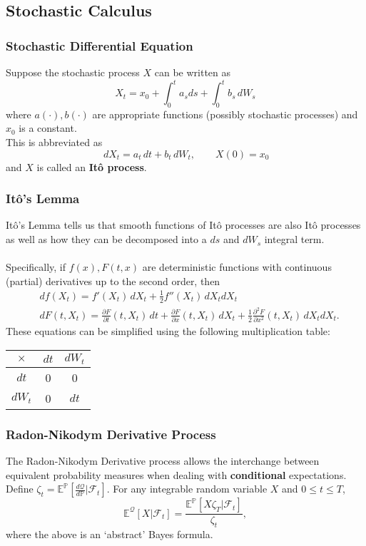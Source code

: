 \documentclass[11pt]{article}
\newcommand{\E}{\mathbb{E}}
\newcommand{\F}{\mathcal{F}}
\renewcommand{\Pr}{\mathbb{P}}
\newcommand{\Q}{\mathcal{Q}}
\begin{document}
	\subsection{Stochastic Calculus} 
	\subsubsection{Stochastic Differential Equation}
	Suppose the stochastic process \( X \) can be written as
	\[	X_t = x_0 + \int_{0}^{t} a_s ds + \int_{0}^{t} b_s \, dW_s\]
	where \( a(\cdot), b(\cdot) \) are appropriate functions (possibly stochastic processes) and \( x_0 \) is a constant.\\
	This is abbreviated as
	\[	\, dX_t = a_t \, dt + b_t \, dW_t, \qquad X(0) = x_0\]
	and \( X \) is called an \textbf{It\^{o} process}.
	\subsubsection{It\^{o}'s Lemma}
	It\^{o}'s Lemma tells us that smooth functions of It\^{o} processes are also It\^{o} processes as well as how they can be decomposed into a \( ds \) and \( dW_s \) integral term. \\\\
	\noindent Specifically, if \( f(x), F(t, x) \) are deterministic functions with continuous (partial) derivatives up to the second order, then
	\begin{align*}
		& df(X_t) = f'(X_t) \, dX_t + \frac{1}{2}f''(X_t) \, dX_t dX_t \\
		& dF(t, X_t) = \frac{\partial F}{\partial t}(t, X_t)\, dt + \frac{\partial F}{\partial x}(t, X_t) \, dX_t + \frac{1}{2}\frac{\partial^2 F}{\partial x^2}(t, X_t) \, dX_t dX_t.
	\end{align*}
	These equations can be simplified using the following multiplication table:
	\begin{center}
		\begin{tabular}{ccc}
			\( \times \) & \( dt \) & \( dW_t \)\\
			\hline
			\hline
			\( dt \) & 0 & 0 \\
			\hline
			\( dW_t \) & 0 & $dt$ \\
			\hline
			\end{tabular}
		\end{center}
	\subsubsection{Radon-Nikodym Derivative Process}
	The Radon-Nikodym Derivative process allows the interchange between equivalent probability measures when dealing with \textbf{conditional} expectations. Define \( \zeta_t = \E^{\Pr}[\frac{d\Q}{d\Pr}|\mathcal{F}_t]\). For any integrable random variable \( X \) and \( 0\leq t\leq T \),
	\[
		\E^{\Q}[X|\F_t] = \frac{\E^{\Pr}[X\zeta_T|\F_t]}{\zeta_t},
		\]
	where the above is an `abstract' Bayes formula.
\end{document}
